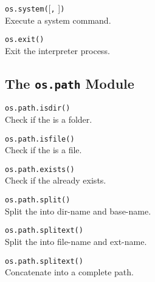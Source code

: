 \hangpar \texttt{os.system(}[\texttt{,} ]\texttt{)} \\
Execute a system command.

\hangpar \texttt{os.exit()}\\
Exit the interpreter process.

\subsection*{The \texttt{os.path} Module}

\hangpar \texttt{os.path.isdir(}\texttt{)} \\
Check if the  is a folder.

\hangpar \texttt{os.path.isfile(}\texttt{)} \\
Check if the  is a file.

\hangpar \texttt{os.path.exists(}\texttt{)} \\
Check if the  already exists.

\hangpar \texttt{os.path.split(}\texttt{)} \\
Split the  into dir-name and base-name.

\hangpar \texttt{os.path.splitext(}\texttt{)} \\
Split the  into file-name and ext-name.

\hangpar \texttt{os.path.splitext(}\texttt{)} \\
Concatenate  into a complete path.
